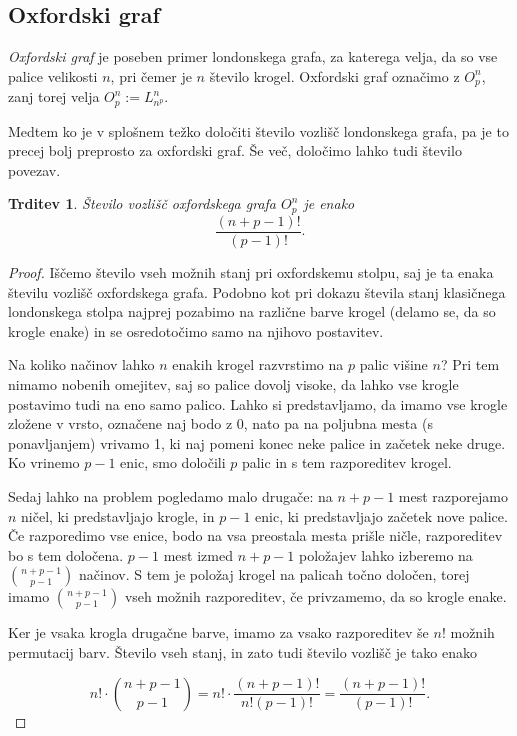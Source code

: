 \documentclass[12pt,a4paper]{amsart}
\theoremstyle{definition} %
\theoremstyle{plain} %
\newtheorem{trditev}[definicija]{Trditev}
\begin{document}
\subsection{Oxfordski graf}

\emph{Oxfordski graf} je poseben primer londonskega grafa, za katerega velja, da so vse palice velikosti $n$, pri čemer je $n$ število krogel. Oxfordski graf označimo z $O^n_p$, zanj torej velja $O^n_p := L^n_{n^p}$.

Medtem ko je v splošnem težko določiti število vozlišč londonskega grafa, pa je to precej bolj preprosto za oxfordski graf. Še več, določimo lahko tudi število povezav.

\begin{trditev}
    Število vozlišč oxfordskega grafa $O^n_p$ je enako \[\frac{(n+p-1)!}{(p-1)!}.\]
\end{trditev}

\begin{proof}
    Iščemo število vseh možnih stanj pri oxfordskemu stolpu, saj je ta enaka številu vozlišč oxfordskega grafa.
    Podobno kot pri dokazu števila stanj klasičnega londonskega stolpa najprej pozabimo na različne barve krogel (delamo se, da so krogle enake) in se osredotočimo samo na njihovo postavitev. 
    
    Na koliko načinov lahko $n$ enakih krogel razvrstimo na $p$ palic višine $n$? Pri tem nimamo nobenih omejitev, saj so palice dovolj visoke, da lahko vse krogle postavimo tudi na eno samo palico. Lahko si predstavljamo, da imamo vse krogle zložene v vrsto, označene naj bodo z 0, nato pa na poljubna mesta (s ponavljanjem) vrivamo 1, ki naj pomeni konec neke palice in začetek neke druge. Ko vrinemo $p-1$ enic, smo določili $p$ palic in s tem razporeditev krogel. 
    
    Sedaj lahko na problem pogledamo malo drugače: na $n+p-1$ mest razporejamo $n$ ničel, ki predstavljajo krogle, in $p-1$ enic, ki predstavljajo začetek nove palice. Če razporedimo vse enice, bodo na vsa preostala mesta prišle ničle, razporeditev bo s tem določena. $p-1$ mest izmed $n+p-1$ položajev lahko izberemo na ${n+p-1 \choose p-1}$ načinov. S tem je položaj krogel na palicah točno določen, torej imamo ${n+p-1 \choose p-1}$ vseh možnih razporeditev, če privzamemo, da so krogle enake. 
    
    Ker je vsaka krogla drugačne barve, imamo za vsako razporeditev še $n!$ možnih permutacij barv. Število vseh stanj, in zato tudi število vozlišč je tako enako
    
    \[ n! \cdot {n+p-1 \choose p-1} = n! \cdot \frac{(n+p-1)!}{n!(p-1)!} = \frac{(n+p-1)!}{(p-1)!}. \] \qedhere
\end{proof}
\end{document}
